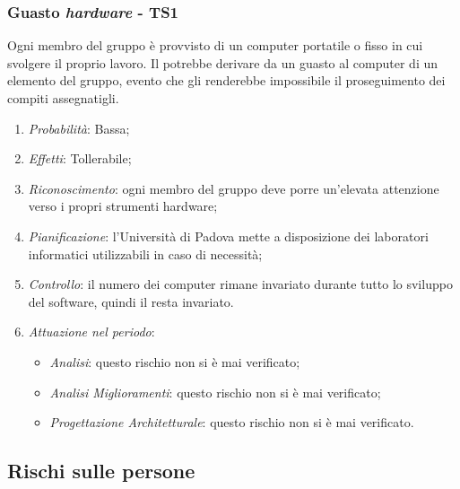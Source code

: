\subsubsection{Guasto \textit{hardware} - TS1}
Ogni membro del gruppo \`e provvisto di un computer portatile o fisso in cui svolgere il proprio lavoro. Il  potrebbe derivare da un guasto al computer di un elemento del gruppo, evento che gli renderebbe impossibile il proseguimento dei compiti assegnatigli.
\begin{enumerate}
\item \textit{Probabilit\`a}: Bassa;
\item \textit{Effetti}: Tollerabile; 
\item \textit{Riconoscimento}: ogni membro del gruppo deve porre un’elevata attenzione verso i propri strumenti hardware;
\item \textit{Pianificazione}: l'Universit\`a di Padova mette a disposizione dei laboratori informatici utilizzabili
in caso di necessit\`a;
\item \textit{Controllo}: il numero dei computer rimane invariato durante tutto lo sviluppo del software, quindi il  resta invariato.
\item \textit{Attuazione nel periodo}: 
	\begin{itemize}
	\item \textit{Analisi}: questo rischio non si è mai verificato;
	\item \textit{Analisi Miglioramenti}: questo rischio non si è mai verificato;
	\item \textit{Progettazione Architetturale}: questo rischio non si è mai verificato.
	\end{itemize}
\end{enumerate}

\subsection{Rischi sulle persone}
